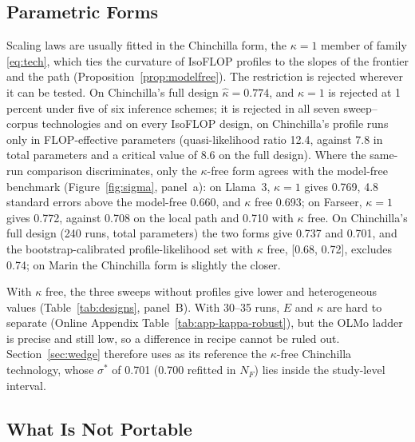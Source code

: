 \subsection{Parametric Forms}\label{sec:tech:parametric}\label{sec:tech:sweeps}

Scaling laws are usually fitted in the Chinchilla form, the $\kappa=1$ member of family \eqref{eq:tech}, which ties the
curvature of IsoFLOP profiles to the slopes of the frontier and the path (Proposition~\ref{prop:modelfree}). The
restriction is rejected wherever it can be tested. On Chinchilla's full design $\hat\kappa=0.774$, and $\kappa=1$ is
rejected at 1 percent under five of six inference schemes; it is
rejected in all seven sweep--corpus technologies and on every IsoFLOP design, on Chinchilla's profile runs only in
FLOP-effective parameters (quasi-likelihood ratio 12.4, against 7.8 in total parameters and a critical value of 8.6 on
the full design). Where the same-run comparison discriminates, only the $\kappa$-free form agrees with the model-free
benchmark (Figure~\ref{fig:sigma}, panel~a): on Llama~3, $\kappa=1$ gives 0.769, 4.8 standard errors above the
model-free 0.660, and $\kappa$ free 0.693; on Farseer, $\kappa=1$ gives 0.772, against 0.708 on the local path and
0.710 with $\kappa$ free. On Chinchilla's full design (240 runs, total parameters) the two
forms give 0.737 and 0.701, and the bootstrap-calibrated profile-likelihood set with $\kappa$ free, [0.68, 0.72],
excludes 0.74; on Marin the Chinchilla form is slightly the closer.

With $\kappa$ free, the three sweeps without profiles give lower and heterogeneous values (Table~\ref{tab:designs},
panel~B). With 30--35 runs, $E$ and $\kappa$ are hard to separate (Online Appendix Table~\ref{tab:app-kappa-robust}), but
the OLMo ladder is precise and still low, so a difference in recipe cannot be ruled out. Section~\ref{sec:wedge}
therefore uses as its reference the $\kappa$-free Chinchilla technology, whose $\sigma^*$ of 0.701 (0.700 refitted in
$N_F$) lies inside the study-level interval.

\subsection{What Is Not Portable}\label{sec:tech:portable}\label{sec:tech:quality}\label{sec:tech:measurement}

